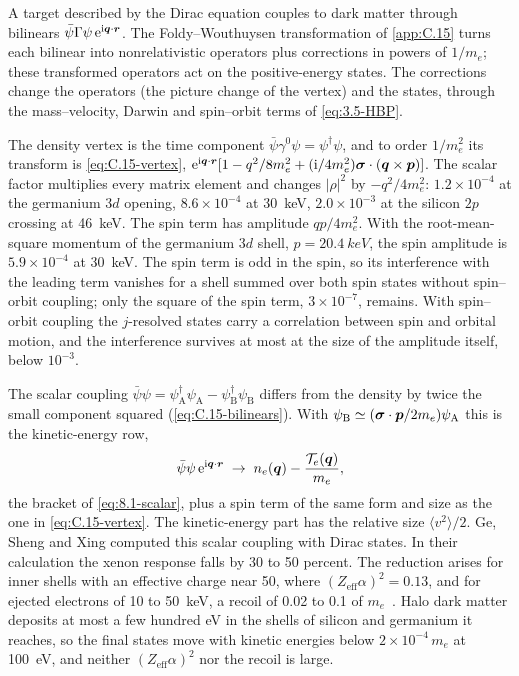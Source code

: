 A target described by the Dirac equation couples to dark matter through bilinears $\bar\psi\Gamma\psi\,\mathrm{e}^{\mathrm{i}\bm{q}\cdot\bm{r}}$. The Foldy--Wouthuysen transformation of \cref{app:C.15} turns each bilinear into nonrelativistic operators plus corrections in powers of $1/m_e$; these transformed operators act on the positive-energy states. The corrections change the operators (the picture change of the vertex) and the states, through the mass--velocity, Darwin and spin--orbit terms of \cref{eq:3.5-HBP}.

The density vertex is the time component $\bar\psi\gamma^0\psi = \psi^\dagger\psi$, and to order $1/m_e^2$ its transform is \cref{eq:C.15-vertex}, $\mathrm{e}^{\mathrm{i}\bm{q}\cdot\bm{r}}[1 - q^2/8m_e^2 + (\mathrm{i}/4m_e^2)\boldsymbol{\sigma}\cdot(\bm{q}\times\bm{p})]$. The scalar factor multiplies every matrix element and changes $|\rho|^2$ by $-q^2/4m_e^2$: $1.2\times10^{-4}$ at the germanium $3d$ opening, $8.6\times10^{-4}$ at \SI{30}{keV}, $2.0\times10^{-3}$ at the silicon $2p$ crossing at \SI{46}{keV}. The spin term has amplitude $qp/4m_e^2$. With the root-mean-square momentum of the germanium $3d$ shell, $p = \SI{20.4}{keV}$, the spin amplitude is $5.9\times10^{-4}$ at \SI{30}{keV}. The spin term is odd in the spin, so its interference with the leading term vanishes for a shell summed over both spin states without spin--orbit coupling; only the square of the spin term, $3\times10^{-7}$, remains. With spin--orbit coupling the $j$-resolved states carry a correlation between spin and orbital motion, and the interference survives at most at the size of the amplitude itself, below $10^{-3}$.

The scalar coupling $\bar\psi\psi = \psi^\dagger_{\mathrm{A}}\psi_{\mathrm{A}} - \psi^\dagger_{\mathrm{B}}\psi_{\mathrm{B}}$ differs from the density by twice the small component squared (\cref{eq:C.15-bilinears}). With $\psi_{\mathrm{B}} \simeq (\boldsymbol{\sigma}\cdot\bm{p}/2m_e)\psi_{\mathrm{A}}$ this is the kinetic-energy row,
\begin{equation}
  \bar\psi\psi\,\mathrm{e}^{\mathrm{i}\bm{q}\cdot\bm{r}} \;\to\; n_e(\bm{q}) - \frac{\mathcal{T}_e(\bm{q})}{m_e} ,
  \label{eq:10.6-scalar}
\end{equation}
the bracket of \cref{eq:8.1-scalar}, plus a spin term of the same form and size as the one in \cref{eq:C.15-vertex}. The kinetic-energy part has the relative size $\langle v^2\rangle/2$. Ge, Sheng and Xing computed this scalar coupling with Dirac states. In their calculation the xenon response falls by 30 to 50 percent. The reduction arises for inner shells with an effective charge near 50, where $(Z_{\mathrm{eff}}\alpha)^2 = 0.13$, and for ejected electrons of 10 to \SI{50}{keV}, a recoil of 0.02 to 0.1 of $m_e$~\cite[Sects.~1 and~5.2]{ge2026relativistic}. Halo dark matter deposits at most a few hundred eV in the shells of silicon and germanium it reaches, so the final states move with kinetic energies below $2\times10^{-4}\,m_e$ at \SI{100}{eV}, and neither $(Z_{\mathrm{eff}}\alpha)^2$ nor the recoil is large.

